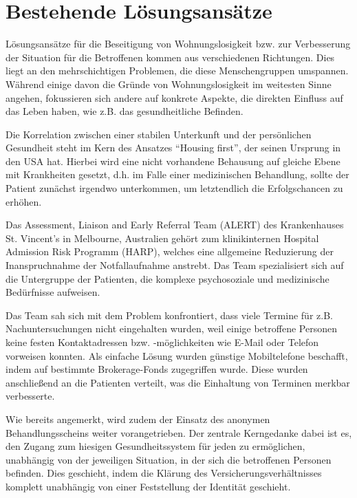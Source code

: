 \section{Bestehende Lösungsansätze}

Lösungsansätze für die Beseitigung von Wohnungslosigkeit bzw. zur Verbesserung der Situation für die Betroffenen kommen aus verschiedenen Richtungen. Dies liegt an den mehrschichtigen Problemen, die diese Menschengruppen umspannen. Während einige davon die Gründe von Wohnungslosigkeit im weitesten Sinne angehen, fokussieren sich andere auf konkrete Aspekte, die direkten Einfluss auf das Leben haben, wie z.B. das gesundheitliche Befinden.

Die Korrelation zwischen einer stabilen Unterkunft und der persönlichen Gesundheit steht im Kern des Ansatzes \enquote{Housing first}, der seinen Ursprung in den USA hat. Hierbei wird eine nicht vorhandene Behausung auf gleiche Ebene mit Krankheiten gesetzt, d.h. im Falle einer medizinischen Behandlung, sollte der Patient zunächst irgendwo unterkommen, um letztendlich die Erfolgschancen zu erhöhen. \citep{Srebnik.2013}

Das Assessment, Liaison and Early Referral Team (ALERT) des Krankenhauses St. Vincent's in Melbourne, Australien gehört zum klinikinternen Hospital Admission Risk Programm (HARP), welches eine allgemeine Reduzierung der Inanspruchnahme der Notfallaufnahme anstrebt. Das Team spezialisiert sich auf die Untergruppe der Patienten, die komplexe psychosoziale und medizinische Bedürfnisse aufweisen.

Das Team sah sich mit dem Problem konfrontiert, dass viele Termine für z.B. Nachuntersuchungen nicht eingehalten wurden, weil einige betroffene Personen keine festen Kontaktadressen bzw. -möglichkeiten wie E-Mail oder Telefon vorweisen konnten. Als einfache Lösung wurden günstige Mobiltelefone beschafft, indem auf bestimmte Brokerage-Fonds zugegriffen wurde. Diese wurden anschließend an die Patienten verteilt, was die Einhaltung von Terminen merkbar verbesserte. \citep{Davies.2018}

Wie bereits angemerkt, wird zudem der Einsatz des anonymen Behandlungsscheins weiter vorangetrieben. Der zentrale Kerngedanke dabei ist es, den Zugang zum hiesigen Gesundheitssystem für jeden zu ermöglichen, unabhängig von der jeweiligen Situation, in der sich die betroffenen Personen befinden. Dies geschieht, indem die Klärung des Versicherungsverhältnisses komplett unabhängig von einer Feststellung der Identität geschieht. \citep{Zanders.2022}

